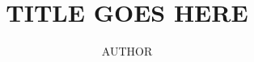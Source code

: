 \documentclass[11pt, twoside, mscthesisonly]{vuwthesis.cls}
\theoremstyle{definition}
\begin{document}
    \let\temp\phi
    \let\phi\varphi
    \let\varphi\temp
    \vuwfrontmatter

    \title{TITLE GOES HERE}
    \author{AUTHOR}
    \subject{Mathematics}

    \maketitle

    

    

    \tableofcontents


    \vuwmainmatter


    
    
    


    \vuwbackmatter

    \printbibliography
\end{document}
